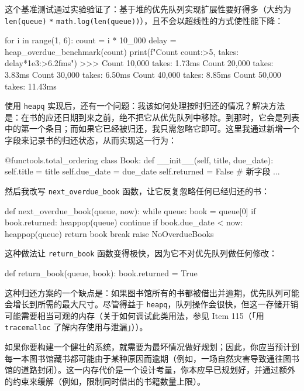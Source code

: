 这个基准测试通过实验验证了：基于堆的优先队列实现扩展性要好得多（大约为 \texttt{len(queue)} \texttt{*} \texttt{math.log(len(queue))}），且不会以超线性的方式使性能下降：

\begin{codebox}[python]
for i in range(1, 6):
    count = i * 10_000
    delay = heap_overdue_benchmark(count)
    print(f"Count {count:>5,} takes: {delay*1e3:>6.2f}ms")
>>>
Count 10,000 takes:   1.73ms
Count 20,000 takes:   3.83ms
Count 30,000 takes:   6.50ms
Count 40,000 takes:   8.85ms
Count 50,000 takes:  11.43ms
\end{codebox}

使用 \texttt{heapq} 实现后，还有一个问题：我该如何处理按时归还的情况？解决方法是：在书的应还日期到来之前，绝不把它从优先队列中移除。到那时，它会是列表中的第一个条目；而如果它已经被归还，我只需忽略它即可。这里我通过新增一个字段来记录书的归还状态，从而实现这一行为：

\begin{codebox}[python]
@functools.total_ordering
class Book:
    def __init__(self, title, due_date):
        self.title = title
        self.due_date = due_date
        self.returned = False  # 新字段
    ...
\end{codebox}

然后我改写 \texttt{next\_overdue\_book} 函数，让它反复忽略任何已经归还的书：

\begin{codebox}[python]
def next_overdue_book(queue, now):
    while queue:
        book = queue[0]
        if book.returned:
            heappop(queue)
            continue
        if book.due_date < now:
            heappop(queue)
            return book
        break
    raise NoOverdueBooks
\end{codebox}

这种做法让 \texttt{return\_book} 函数变得极快，因为它不对优先队列做任何修改：

\begin{codebox}[python]
def return_book(queue, book):
    book.returned = True
\end{codebox}

这种归还方案的一个缺点是：如果图书馆所有的书都被借出并逾期，优先队列可能会增长到所需的最大尺寸。尽管得益于 \texttt{heapq}，队列操作会很快，但这一存储开销可能需要相当可观的内存（关于如何调试此类用法，参见 Item 115（「用 \texttt{tracemalloc} 了解内存使用与泄漏」））。

如果你要构建一个健壮的系统，就需要为最坏情况做好规划；因此，你应当预计到每一本图书馆藏书都可能由于某种原因而逾期（例如，一场自然灾害导致通往图书馆的道路封闭）。这一内存代价是一个设计考量，你本应早已规划好，并通过额外的约束来缓解（例如，限制同时借出的书籍数量上限）。

